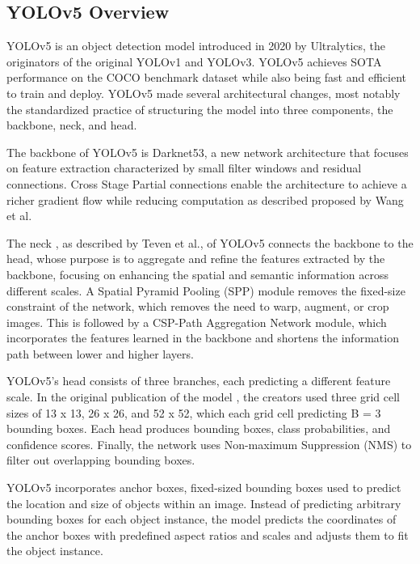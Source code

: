\documentclass[10pt,twocolumn,letterpaper]{article}
\begin{document}
\subsection{YOLOv5 Overview}

YOLOv5 \cite{Drone-Detection-Using-YOLOv5} is an object detection model introduced in 2020 by Ultralytics, the originators of the original YOLOv1 and YOLOv3. YOLOv5 achieves SOTA performance on the COCO benchmark dataset \cite{YOLOv5Doc} while also being fast and efficient to train and deploy. YOLOv5 made several architectural changes, most notably the standardized practice of structuring the model into three components, the backbone, neck, and head.

The backbone of YOLOv5 is Darknet53, a new network architecture that focuses on feature extraction characterized by small filter windows and residual connections. Cross Stage Partial connections enable the architecture to achieve a richer gradient flow while reducing computation as described \cite{cspNET} proposed by Wang et al. 

The neck \cite{CompReview}, as described by Teven et al., of YOLOv5 connects the backbone to the head, whose purpose is to aggregate and refine the features extracted by the backbone, focusing on enhancing the spatial and semantic information across different scales. A Spatial Pyramid Pooling (SPP) \cite{SPP} module removes the fixed-size constraint of the network, which removes the need to warp, augment, or crop images. This is followed by a CSP-Path Aggregation Network \cite{cspNET} module, which incorporates the features learned in the backbone and shortens the information path between lower and higher layers.

YOLOv5’s head consists of three branches, each predicting a different feature scale. In the original publication of the model \cite{YOLOv5Doc}, the creators used three grid cell sizes of 13 x 13, 26 x 26, and 52 x 52, which each grid cell predicting B = 3 bounding boxes. Each head produces bounding boxes, class probabilities, and confidence scores. Finally, the network uses Non-maximum Suppression (NMS) \cite{NMS} to filter out overlapping bounding boxes.

YOLOv5 incorporates anchor boxes, fixed-sized bounding boxes used to predict the location and size of objects within an image. Instead of predicting arbitrary bounding boxes for each object instance, the model predicts the coordinates of the anchor boxes with predefined aspect ratios and scales and adjusts them to fit the object instance.
\end{document}
